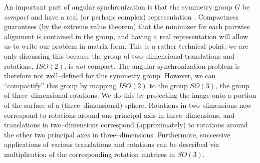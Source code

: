 \documentclass[twocolumn, 11pt]{article}
\begin{document}
An important part of angular synchronization is that the symmetry group $G$ be {\em compact} and have a real (or perhaps complex) representation \cite{singer2011angular}.
%
Compactness guarantees (by the extreme value theorem) that the minimizer for each pairwise alignment is contained in the group,
and having a real representation will allow us to write our problem in matrix form. 
%
This is a rather technical point;
we are only discussing this because the group of two--dimensional translations and rotations, $ISO(2)$, is {\em not} compact.
%
The angular synchronization problem is therefore not well--defined for this symmetry group.
%
However, we can ``compactify'' this group by mapping $ISO(2)$ to the group $SO(3)$, the group of three--dimensional rotations.
%
We do this by projecting the image onto a portion of the surface of a (three--dimensional) sphere.
%
Rotations in two--dimensions now correspond to rotations around one principal axis in three--dimensions, and translations in two--dimensions correspond (approximately) to rotations around the other two principal axes in three--dimensions.
%
Furthermore, successive applications of various translations and rotations can be described via multiplication of the corresponding rotation matrices in $SO(3)$.
\end{document}
